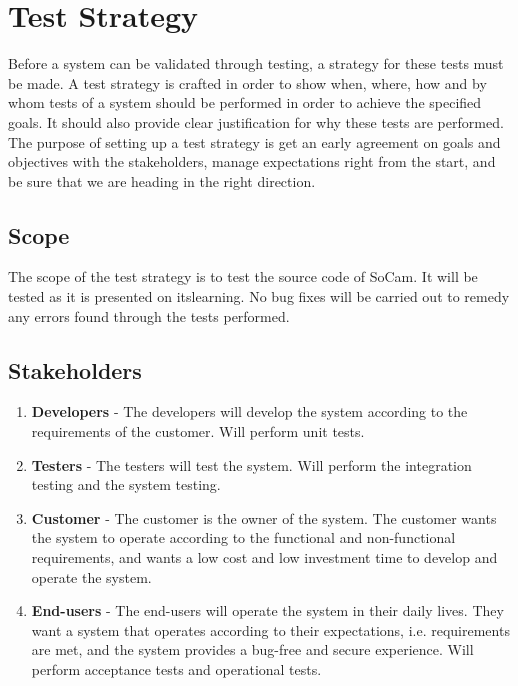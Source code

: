 \label{test_strategy}
\section{Test Strategy}

Before a system can be validated through testing, a strategy for these tests must be made. A test strategy is crafted in order to show when, where, how and by whom tests of a system should be performed in order to achieve the specified goals. It should also provide clear justification for why these tests are performed. The purpose of setting up a test strategy is get an early agreement on goals and objectives with the stakeholders, manage expectations right from the start, and be sure that we are heading in the right direction.

\subsection{Scope}
The scope of the test strategy is to test the source code of SoCam. It will be tested as  it is presented on itslearning. No bug fixes will be carried out to remedy any errors found through the tests performed. 

\subsection{Stakeholders}

\begin{enumerate}

    \item \textbf{Developers} - The developers will develop the system according to the requirements of the customer. Will perform unit tests.
    
    \item \textbf{Testers} - The testers will test the system. Will perform the integration testing and the system testing. 
    
    \item \textbf{Customer} - The customer is the owner of the system. The customer wants the
    system to operate according to the functional and non-functional requirements, and wants a low cost and low investment time to develop and operate the system. 
    
    \item \textbf{End-users} - The end-users will operate the system in their daily lives. They want a system that operates according to their expectations, i.e. requirements are met, and the system provides a bug-free and secure experience. Will perform acceptance tests and operational tests. 
    
\end{enumerate}

